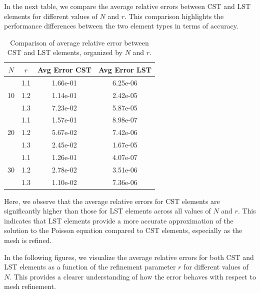 \documentclass[12pt]{article}
\begin{document}
In the next table, we compare the average relative errors between CST and LST elements for different values of $N$ and $r$. This comparison highlights the performance differences between the two element types in terms of accuracy.

\begin{table}[H]
\centering
\caption{Comparison of average relative error between CST and LST elements, organized by $N$ and $r$.}
\begin{tabular}{|c|c|c|c|}
\hline
\textbf{$N$} & \textbf{$r$} & \textbf{Avg Error CST} & \textbf{Avg Error LST} \\
\hline
\multirow{3}{*}{10} 
& 1.1 & 1.66e-01 & 6.25e-06 \\
& 1.2 & 1.14e-01 & 2.42e-05 \\
& 1.3 & 7.23e-02 & 5.87e-05 \\
\hline
\multirow{3}{*}{20} 
& 1.1 & 1.57e-01 & 8.98e-07 \\
& 1.2 & 5.67e-02 & 7.42e-06 \\
& 1.3 & 2.45e-02 & 1.67e-05 \\
\hline
\multirow{3}{*}{30} 
& 1.1 & 1.26e-01 & 4.07e-07 \\
& 1.2 & 2.78e-02 & 3.51e-06 \\
& 1.3 & 1.10e-02 & 7.36e-06 \\
\hline
\end{tabular}
\label{tab:avg_error_comparison_refined}
\end{table}

Here, we observe that the average relative errors for CST elements are significantly higher than those for LST elements across all values of $N$ and $r$. This indicates that LST elements provide a more accurate approximation of the solution to the Poisson equation compared to CST elements, especially as the mesh is refined.

In the following figures, we visualize the average relative errors for both CST and LST elements as a function of the refinement parameter $r$ for different values of $N$. This provides a clearer understanding of how the error behaves with respect to mesh refinement.
\end{document}
